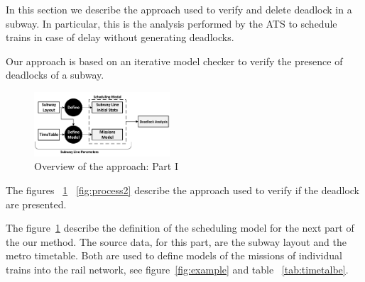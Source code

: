 



In this section we describe the approach used to verify and delete deadlock in a subway.
In particular, this is the analysis performed by the ATS to schedule trains in case of delay without generating deadlocks.


Our approach is based on an iterative model checker to verify the presence of deadlocks of a subway.

\begin{figure}[h!]
	\begin{centering}	
	\includegraphics[width=0.45\textwidth, clip]{img/processo1}
	\caption{Overview of the approach: Part I}
	\label{fig:process1}
	\end{centering}
\end{figure}

The figures ~\ref{fig:process1} ~\ref{fig:process2} describe the approach used to verify if the deadlock are presented.

The figure~\ref{fig:process1} describe the definition of the scheduling model for the next part of the our method.
The source data, for this part, are the subway  layout and the metro timetable. Both are used to define models of the missions of individual trains into the rail network, see figure~\ref{fig:example} and table ~\ref{tab:timetalbe}.


